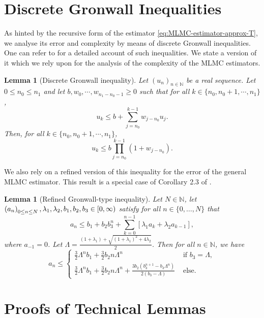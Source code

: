 \documentclass[11pt]{article}
\numberwithin{equation}{section}
\newtheorem{lemma}[theorem]{Lemma}
\theoremstyle{definition}
\theoremstyle{remark}
\def\N{{\mathbb{N}}}
\newcommand{\citet}{\cite}
\begin{document}
\appendix

 
\section{Discrete Gronwall Inequalities}
\label{appendix:discrete-gronwall}
As hinted by the recursive form of the estimator \eqref{eq:MLMC-estimator-approx-T}, we analyse its error and complexity by means of discrete Gronwall inequalities. One can refer to \citet{agarwal2000difference} for a detailed account of such inequalities. We state a version of it which we rely upon for the analysis of the complexity of the MLMC estimators.

\begin{lemma}[Discrete Gronwall inequality]
    \label{lemma:discrete-gronwall}
    Let $(u_n)_{n \in \N}$ be a real sequence. Let $0 \leq n_0 \leq n_1$ and let $b, w_0, \cdots, w_{n_1 - n_0 - 1} \geq 0$ such that for all $k \in \{n_0, n_0 + 1, \cdots, n_1\}$,
    \[
        u_k \leq b + \sum_{j = n_0}^{k - 1} w_{j - n_0} u_{j}.
    \]
    Then, for all $k \in \{n_0, n_0 + 1, \cdots, n_1\}$,
    \[
        u_k \leq b \prod_{j = n_0}^{k-1}(1 + w_{j - n_0}).
    \]
\end{lemma}

We also rely on a refined version of this inequality for the error of the general MLMC estimator. This result is a special case of Corollary 2.3 of \citet{hutzenthaler2022multilevel}.

\begin{lemma}[Refined Gronwall-type inequality] 
\label{lemma:refined-gronwall}
Let $N \in \N$, let $\left(a_n\right)_{0 \leq n \leq N},\lambda_1, \lambda_2, b_1,\\ b_2,b_3\in[0, \infty)$ satisfy for all $n \in \{0,\ldots, N\}$ that
$$
a_n \leq b_1 + b_2 b_3^n +\sum_{k=0}^{n-1}\left[\lambda_1 a_k+\lambda_2 a_{k-1}\right],
$$
where $a_{-1} = 0$.
Let $\Lambda=\frac{(1+\lambda_1)+\sqrt{(1+\lambda_1)^2+4 \lambda_2}}{2}$. 
Then for all $n \in \mathbb{N}$, we have 
$$
a_n \leq \begin{cases}\frac{3}{2} \Lambda^n b_1+\frac{3}{2} b_2 n \Lambda^n & \text { if } b_3=\Lambda, \\ 
\frac{3}{2} \Lambda^n b_1+\frac{3}{2} b_2 n \Lambda^n +\frac{3 b_2\left(b_3^{n+1}-b_3 \Lambda^n\right)}{2\left(b_3-\Lambda\right)} & \text { else. }\end{cases}
$$

\end{lemma}

\section{Proofs of Technical Lemmas}
\label{appendix:proofs}
\end{document}
